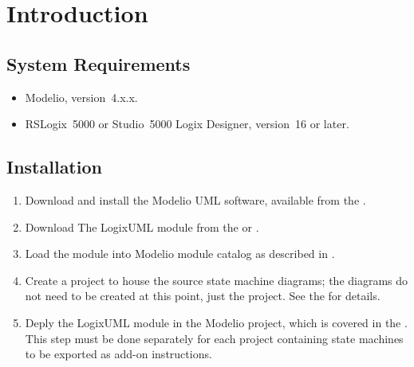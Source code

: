 \section{Introduction}


\subsection{System Requirements}

\begin{itemize}
  \item Modelio, version~4.x.x.

  \item RSLogix~5000 or Studio~5000 Logix Designer, version~16 or later.
\end{itemize}


\subsection{Installation}

\begin{enumerate}
  \item Download and install the Modelio UML software, available from the
    \textcite{MODELIO}.

  \item Download The LogixUML module from the \textcite{MODELIOSTORE} or
    \textcite{REPO}.

  \item Load the module into Modelio module catalog as described in
    \textcite[Macros catalog]{MODELIOMANUAL}.

  \item Create a project to house the source state machine diagrams;
    the diagrams do not need to be created at this point, just the project.
    See the \textcite[Creating a project]{MODELIOMANUAL} for details.

  \item Deply the LogixUML module in the Modelio project, which is covered
    in the \textcite[Configuring project modules]{MODELIOMANUAL}.
    This step must be done separately for each project containing state
    machines to be exported as add-on instructions.
\end{enumerate}
